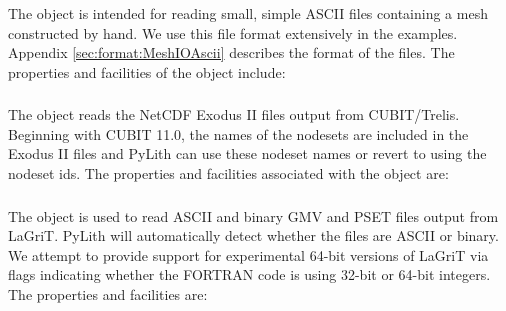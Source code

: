 
\subsubsection{}

The  object is intended for reading small, simple
ASCII files containing a mesh constructed by hand. We use this file
format extensively in the examples. Appendix \vref{sec:format:MeshIOAscii}
describes the format of the files. The properties and facilities of
the  object include:
\begin{inventory}
\end{inventory}

\subsubsection{}
\label{sec:MeshIOCubit}

The  object reads the NetCDF Exodus II files output from
CUBIT/Trelis. Beginning with CUBIT 11.0, the names of the nodesets are included
in the Exodus II files and PyLith can use these nodeset names or revert
to using the nodeset ids. The properties and facilities associated
with the  object are:
\begin{inventory}
\end{inventory}

\subsubsection{}
\label{sec:MeshIOLagrit}

The  object is used to read ASCII and binary GMV and PSET
files output from LaGriT. PyLith will automatically detect whether
the files are ASCII or binary. We attempt to provide support for experimental
64-bit versions of LaGriT via flags indicating whether the FORTRAN
code is using 32-bit or 64-bit integers. The  properties
and facilities are:
\begin{inventory}
\end{inventory}

